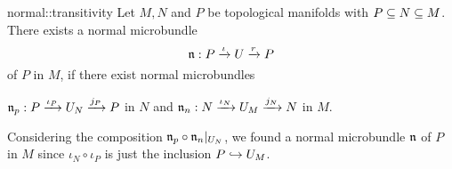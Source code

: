 \begin{mylemma}{normal::transitivity}
    Let $M, N$ and $P$ be topological manifolds with $P \sub N \sub M$.
    There exists a normal microbundle
    \[ \bundledef{\bn}{P}{U}{\iota}{r} \]
    of $P$ in $M$, if there exist normal microbundles
    \begin{center}
        $\bn_p: \bundle{P}{U_N}{\iota_P}{j_P}$ in $N$ and $\bn_n: \bundle{N}{U_M}{\iota_N}{j_N}$ in $M$.
    \end{center}
\end{mylemma}

\begin{myproof}
    Considering the composition $\bn_p \circ \bn_n\restr{U_N}$, we found a normal microbundle $\bn$ of $P$ in $M$
    since $\iota_N \circ \iota_P$ is just the inclusion $P \incl U_M$.
\end{myproof}